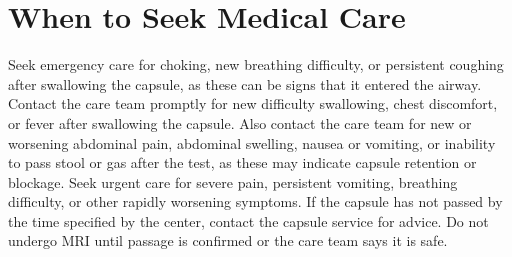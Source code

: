 \section*{When to Seek Medical Care}
Seek emergency care for choking, new breathing difficulty, or persistent coughing after swallowing the capsule, as these can be signs that it entered the airway. Contact the care team promptly for new difficulty swallowing, chest discomfort, or fever after swallowing the capsule. Also contact the care team for new or worsening abdominal pain, abdominal swelling, nausea or vomiting, or inability to pass stool or gas after the test, as these may indicate capsule retention or blockage. Seek urgent care for severe pain, persistent vomiting, breathing difficulty, or other rapidly worsening symptoms. If the capsule has not passed by the time specified by the center, contact the capsule service for advice. Do not undergo MRI until passage is confirmed or the care team says it is safe.

